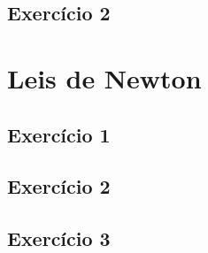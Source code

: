 \documentclass[12pt, a4paper]{article} %
\begin{document}
      
    \subsection{Exerc\'icio 2}

     
\section{Leis de Newton}

    \subsection{Exerc\'icio 1}


    \subsection{Exerc\'icio 2}


    \subsection{Exerc\'icio 3}

       
\end{document}
